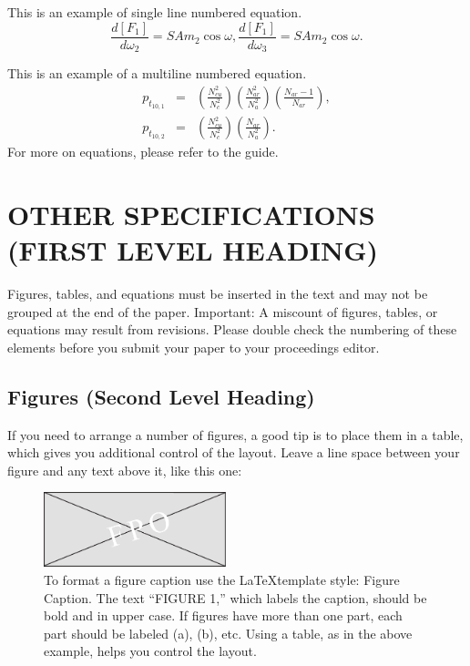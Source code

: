 \documentclass{aip-cp}
\begin{document}
\noindent This is an example of single line numbered equation.
\begin{equation}
\frac{d[F_1]}{d\omega_2} = SAm_2\cos\omega,\frac{d[F_1]}{d\omega_3}= SAm_2\cos\omega.
\end{equation}

This is an example of a multiline numbered equation.
\begin{eqnarray}
p_{t_{10,1}}&=&\left(\frac{N_{cu}^2}{ N_c ^2}\right)\left(\frac{N_{ar}^2}{N_a^2}\right)\left(\frac{N_{ar}-1}{N_{ar}}\right),\\
p_{t_{10,2}}&=&\left(\frac{N_{cu}^2}{ N_c ^2}\right)\left(\frac{N_{ar}}{N_a^2}\right).
\end{eqnarray}
For more on equations, please refer to the guide.

\section{OTHER SPECIFICATIONS (FIRST LEVEL HEADING)}
Figures, tables, and equations must be inserted in the text and may not be grouped at the end of the paper. Important: A miscount of figures, tables, or equations may result from revisions. Please double check the numbering of these elements before you submit your paper to your proceedings editor.

\subsection{Figures (Second Level Heading)}
If you need to arrange a number of figures, a good tip is to place them in a table, which gives you additional control of the layout. Leave a line space between your figure and any text above it, like this one:

\begin{figure}[h]
  \centerline{\includegraphics[width=150pt]{FIGURES-TMP/fig_1}}
  \caption{To format a figure caption use the \LaTeX template style: Figure Caption. The text ``FIGURE 1,'' which labels the caption, should be bold and in upper case. If figures have more than one part, each part should be labeled (a), (b), etc. Using a table, as in the above example, helps you control the layout.}
\end{figure}
\end{document}
